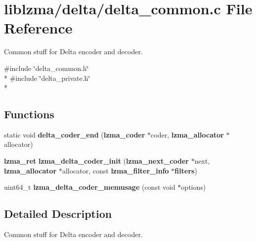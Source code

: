 \section{liblzma/delta/delta\-\_\-common.c File Reference}
\label{delta__common_8c}


Common stuff for Delta encoder and decoder.  


{\ttfamily \#include \char`\"{}delta\-\_\-common.\-h\char`\"{}}\\*
{\ttfamily \#include \char`\"{}delta\-\_\-private.\-h\char`\"{}}\\*
\subsection*{Functions}
\begin{DoxyCompactItemize}
\item 
static void {\bfseries delta\-\_\-coder\-\_\-end} ({\bf lzma\-\_\-coder} $\ast$coder, {\bf lzma\-\_\-allocator} $\ast$allocator)\label{delta__common_8c_a2166aacfdec877dcf6c92cbd30708e1c}

\item 
{\bf lzma\-\_\-ret} {\bfseries lzma\-\_\-delta\-\_\-coder\-\_\-init} ({\bf lzma\-\_\-next\-\_\-coder} $\ast$next, {\bf lzma\-\_\-allocator} $\ast$allocator, const {\bf lzma\-\_\-filter\-\_\-info} $\ast${\bf filters})\label{delta__common_8c_a1a991cc15922568d41b5f79ba47a27ba}

\item 
uint64\-\_\-t {\bfseries lzma\-\_\-delta\-\_\-coder\-\_\-memusage} (const void $\ast$options)\label{delta__common_8c_aa2e090c4f9f8f30d83007a5f2053bf9f}

\end{DoxyCompactItemize}


\subsection{Detailed Description}
Common stuff for Delta encoder and decoder. 